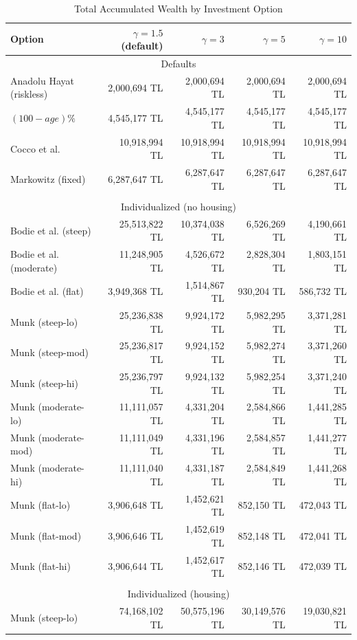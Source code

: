 \documentclass[]{elsarticle}
\begin{document}
\begin{table}[h!]
	\centering
	\caption{Total Accumulated Wealth by Investment Option}
	\label{table:wealth}
	\begin{tabular}[c]{lrrrr}
		\hline
		Option&$\gamma=1.5$ (default) & $\gamma=3$ & $\gamma=5$ & $\gamma=10$\\
		\hline
		\multicolumn{5}{c}{Defaults}\\
Anadolu Hayat (riskless)&2,000,694 TL&2,000,694 TL&2,000,694 TL&2,000,694 TL\\
$(100-age)\%$&4,545,177 TL&4,545,177 TL&4,545,177 TL&4,545,177 TL\\
Cocco et al.&10,918,994 TL&10,918,994 TL&10,918,994 TL&10,918,994 TL\\
Markowitz (fixed) &6,287,647 TL&6,287,647 TL&6,287,647 TL&6,287,647 TL\\
\multicolumn{5}{c}{}\\
\multicolumn{5}{c}{Individualized (no housing)}\\
Bodie et al. (steep)&25,513,822 TL&10,374,038 TL&6,526,269 TL&4,190,661 TL\\
Bodie et al. (moderate)&11,248,905 TL&4,526,672 TL&2,828,304 TL&1,803,151 TL\\
Bodie et al. (flat)&3,949,368 TL&1,514,867 TL&930,204 TL&586,732 TL\\
Munk (steep-lo)&25,236,838 TL&9,924,172 TL&5,982,295 TL&3,371,281 TL\\
Munk (steep-mod)&25,236,817 TL&9,924,152 TL&5,982,274 TL&3,371,260 TL\\
Munk (steep-hi)&25,236,797 TL&9,924,132 TL&5,982,254 TL&3,371,240 TL\\
Munk (moderate-lo)&11,111,057 TL&4,331,204 TL&2,584,866 TL&1,441,285 TL\\
Munk (moderate-mod)&11,111,049 TL&4,331,196 TL&2,584,857 TL&1,441,277 TL\\
Munk (moderate-hi)&11,111,040 TL&4,331,187 TL&2,584,849 TL&1,441,268 TL\\
Munk (flat-lo)&3,906,648 TL&1,452,621 TL&852,150 TL&472,043 TL\\
Munk (flat-mod)&3,906,646 TL&1,452,619 TL&852,148 TL&472,041 TL\\
Munk (flat-hi)&3,906,644 TL&1,452,617 TL&852,146 TL&472,039 TL\\
\multicolumn{5}{c}{}\\
\multicolumn{5}{c}{Individualized (housing)}\\
Munk (steep-lo)&74,168,102 TL&50,575,196 TL&30,149,576 TL&19,030,821 TL\\

\end{tabular}
\end{table}
\end{document}
